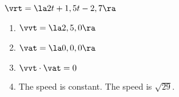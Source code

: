 {$\vrt = \la 2t+1, 5t-2, 7\ra$
}
{\begin{enumerate}
\item $\vvt = \la 2,5,0\ra$
\item $\vat = \la 0,0,0\ra$
\item $\vvt \cdot \vat = 0$
\item The speed is constant.  The speed is $\sqrt{29}$.
\end{enumerate}
}

